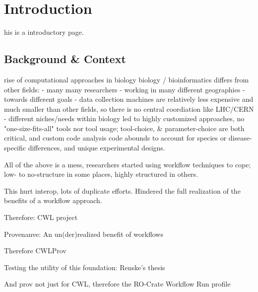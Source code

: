 \chapter{Introduction}
\label{introduction}

\begin{abstract}
Sample Abstract.
\end{abstract}


\newpage

his is a introductory page.




\section{Background \& Context}

rise of computational approaches in biology
biology / bioinformatics differs from other fields:
- many many researchers
- working in many different geographies
- towards different goals
- data collection machines are relatively less expensive and much smaller than other fields, so there is no central coordiation like LHC/CERN
- different niches/needs within biology led to highly customized approaches, no "one-size-fits-all" tools nor tool usage; tool-choice, & parameter-choice are both critical, and custom code analysis code abounds to account for species or disease-specific differences, and unique experimental designs.

All of the above is a mess, researchers started using workflow techniques to cope; low- to no-structure in some places, highly structured in others.

This hurt interop, lots of duplicate efforts. Hindered the full realization of the benefits of a workflow approach.

Therefore: CWL project

Provenanve: An un(der)realized benefit of workflows

Therefore CWLProv

Testing the utility of this foundation: Renske's thesis

And prov not just for CWL, therefore the RO-Crate Workflow Run profile



